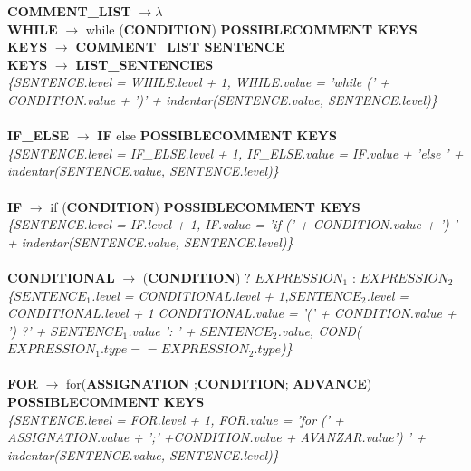 \documentclass[10pt,a4paper]{article}
\begin{document}
\textbf{COMMENT\_LIST} $\rightarrow$$\lambda$ \\

\textbf{WHILE} $\rightarrow$ while (\textbf{CONDITION}) \textbf{POSSIBLECOMMENT KEYS} \\

\textbf{KEYS} $\rightarrow$ \textbf{COMMENT\_LIST SENTENCE} \\ 

\textbf{KEYS} $\rightarrow$ \textbf{LIST\_SENTENCIES} \\

\textit{\{SENTENCE.level = WHILE.level + 1, WHILE.value = 'while (' + CONDITION.value + ')' + indentar(SENTENCE.value, SENTENCE.level)\}}  \\ \\

\textbf{IF\_ELSE} $\rightarrow$ \textbf{IF} else \textbf{POSSIBLECOMMENT KEYS} \\

\textit{\{SENTENCE.level = IF\_ELSE.level + 1, IF\_ELSE.value = IF.value + 'else ' + indentar(SENTENCE.value, SENTENCE.level)\}}  \\ \\

\textbf{IF} $\rightarrow$ if (\textbf{CONDITION}) \textbf{POSSIBLECOMMENT KEYS} \\

\textit{\{SENTENCE.level = IF.level + 1, IF.value = 'if (' + CONDITION.value + ') ' + indentar(SENTENCE.value, SENTENCE.level)\}}  \\ \\

\textbf{CONDITIONAL} $\rightarrow$ (\textbf{CONDITION}) ? \textbf{$EXPRESSION_{1}$} : \textbf{$EXPRESSION_{2}$}  \\

\textit{\{$SENTENCE_{1}$.level = CONDITIONAL.level + 1,$SENTENCE_{2}$.level = CONDITIONAL.level + 1 CONDITIONAL.value = '(' + CONDITION.value + ') ?' + $SENTENCE_{1}$.value ': '  + $SENTENCE_{2}$.value, COND($EXPRESSION_{1}.type == EXPRESSION_{2}.type$)\}} \\ \\
	
\textbf{FOR} $\rightarrow$ for(\textbf{ASSIGNATION} ;\textbf{CONDITION}; \textbf{ADVANCE}) \textbf{POSSIBLECOMMENT KEYS}  \\

\textit{\{SENTENCE.level = FOR.level + 1, FOR.value = 'for (' + ASSIGNATION.value + ';' +CONDITION.value + AVANZAR.value') ' + indentar(SENTENCE.value, SENTENCE.level)\}} \\ \\
\end{document}
